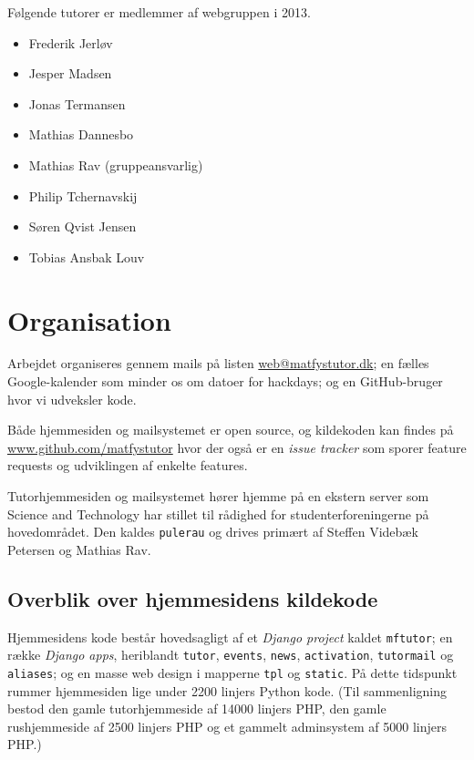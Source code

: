 \documentclass[article,oneside,a4paper]{memoir}
\begin{document}
Følgende tutorer er medlemmer af webgruppen i 2013.

\begin{itemize}\itemsep1pt \parskip0pt 
  \item Frederik Jerløv
  \item Jesper Madsen
  \item Jonas Termansen
  \item Mathias Dannesbo
  \item Mathias Rav (gruppeansvarlig)
  \item Philip Tchernavskij
  \item Søren Qvist Jensen
  \item Tobias Ansbak Louv
\end{itemize}

\chapter{Organisation}

Arbejdet organiseres gennem mails på listen \url{web@matfystutor.dk};
en fælles Google-kalender som minder os om datoer for hackdays; og en
GitHub-bruger hvor vi udveksler kode.

Både hjemmesiden og mailsystemet er open source, og kildekoden kan findes på
\url{www.github.com/matfystutor} hvor der også er en \emph{issue tracker}
som sporer feature requests og udviklingen af enkelte features.

Tutorhjemmesiden og mailsystemet hører hjemme på en ekstern server som Science
and Technology har stillet til rådighed for studenterforeningerne på
hovedområdet.  Den kaldes \texttt{pulerau} og drives primært af Steffen Videbæk
Petersen og Mathias Rav.

\section{Overblik over hjemmesidens kildekode}

Hjemmesidens kode består hovedsagligt af et \emph{Django project} kaldet
\texttt{mftutor}; en række \emph{Django apps}, heriblandt \texttt{tutor},
\texttt{events}, \texttt{news}, \texttt{activation}, \texttt{tutormail} og
\texttt{aliases}; og en masse web design i mapperne \texttt{tpl} og
\texttt{static}.
På dette tidspunkt rummer hjemmesiden lige under 2200 linjers Python kode.
(Til sammenligning bestod den gamle tutorhjemmeside af 14000 linjers PHP,
den gamle rushjemmeside af 2500 linjers PHP
og et gammelt adminsystem af 5000 linjers PHP.)
\end{document}
